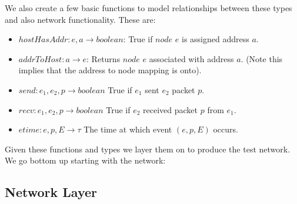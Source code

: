 We also create a few basic functions to model relationships between these types and also network functionality. These
are:
\begin{itemize}
\item $hostHasAddr: e, a \rightarrow boolean$: True if $node$ $e$ is assigned address $a$.
\item $addrToHost: a \rightarrow e$: Returns $node$ $e$ associated with address $a$. (Note this implies that the address
to node mapping is onto).
\item $send: e_1, e_2, p \rightarrow boolean$ True if $e_1$ sent $e_2$ packet $p$.
\item $recv: e_1, e_2, p \rightarrow boolean$ True if $e_2$ received packet $p$ from $e_1$.
\item $etime: e, p, E \rightarrow \tau$ The time at which event $\left( e, p, E \right)$ occurs.
\end{itemize}

Given these functions and types we layer them on to produce the test network. We go bottom up starting with the network:

\subsection{Network Layer}
